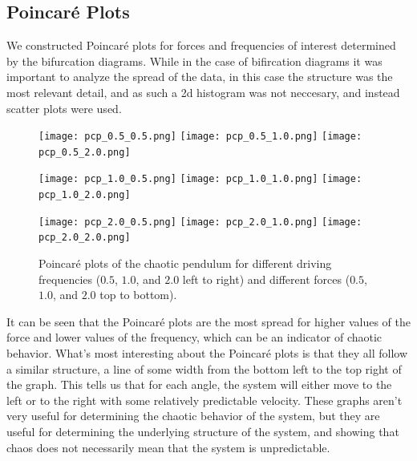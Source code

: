 \documentclass[11pt]{article} %
\begin{document}
    \subsection{Poincar\'e Plots}
    We constructed Poincar\'e plots for forces and frequencies of interest determined by the bifurcation diagrams. While in the case of bifircation
    diagrams it was important to analyze the spread of the data, in this case the structure was the most relevant detail, and as such a 2d histogram
    was not neccesary, and instead scatter plots were used.
    \begin{figure}[H]
        \centering
        \texttt{[image: pcp\_0.5\_0.5.png]}
        \texttt{[image: pcp\_0.5\_1.0.png]}
        \texttt{[image: pcp\_0.5\_2.0.png]}
    \end{figure}
    \begin{figure}[H]
        \centering
        \texttt{[image: pcp\_1.0\_0.5.png]}
        \texttt{[image: pcp\_1.0\_1.0.png]}
        \texttt{[image: pcp\_1.0\_2.0.png]}
    \end{figure}
    \begin{figure}[H]
        \centering
        \texttt{[image: pcp\_2.0\_0.5.png]}
        \texttt{[image: pcp\_2.0\_1.0.png]}
        \texttt{[image: pcp\_2.0\_2.0.png]}
        \caption{Poincar\'e plots of the chaotic pendulum for different driving frequencies ($0.5$, $1.0$, and $2.0$ left to right) and different
        forces ($0.5$, $1.0$, and $2.0$ top to bottom).}
    \end{figure}
    It can be seen that the Poincar\'e plots are the most spread for higher values of the force and lower values of the frequency, which can be
    an indicator of chaotic behavior. What's most interesting about the Poincar\'e plots is that they all follow a similar structure, a line of
    some width from the bottom left to the top right of the graph. This tells us that for each angle, the system will either move to the left or
    to the right with some relatively predictable velocity. These graphs aren't very useful for determining the chaotic behavior of the system,
    but they are useful for determining the underlying structure of the system, and showing that chaos does not necessarily mean that the system
    is unpredictable.\\
\end{document}
